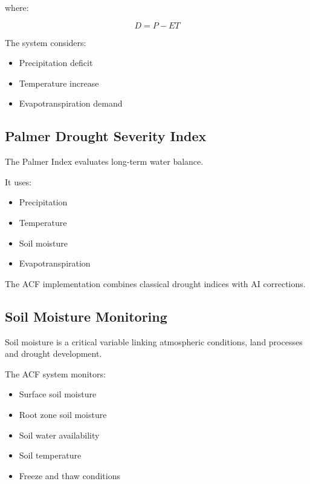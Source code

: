 where:

\[
D=P-ET
\]


The system considers:

\begin{itemize}

\item Precipitation deficit

\item Temperature increase

\item Evapotranspiration demand

\end{itemize}



\subsection{Palmer Drought Severity Index}

The Palmer Index evaluates long-term water balance.

It uses:

\begin{itemize}

\item Precipitation

\item Temperature

\item Soil moisture

\item Evapotranspiration

\end{itemize}


The ACF implementation combines classical drought indices with AI
corrections.

\subsection{Soil Moisture Monitoring}

Soil moisture is a critical variable linking atmospheric conditions,
land processes and drought development.

The ACF system monitors:

\begin{itemize}

\item Surface soil moisture

\item Root zone soil moisture

\item Soil water availability

\item Soil temperature

\item Freeze and thaw conditions

\end{itemize}


